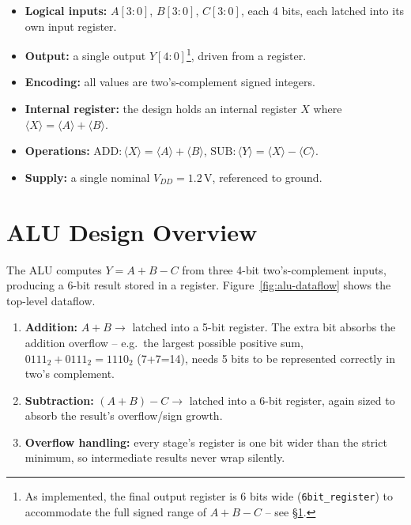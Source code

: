 \documentclass[11pt, a4paper]{article}
\newcommand{\sig}[1]{\texttt{#1}}
\begin{document}
\begin{itemize}
  \item \textbf{Logical inputs:} $A[3{:}0]$, $B[3{:}0]$, $C[3{:}0]$, each 4 bits, each latched into its own input register.
  \item \textbf{Output:} a single output $Y[4{:}0]$\footnote{As implemented, the final output register is 6 bits wide (\sig{6bit\_register}) to accommodate the full signed range of $A+B-C$ -- see \S\ref{sec:overview}.}, driven from a register.
  \item \textbf{Encoding:} all values are two's-complement signed integers.
  \item \textbf{Internal register:} the design holds an internal register $X$ where $\langle X \rangle = \langle A \rangle + \langle B \rangle$.
  \item \textbf{Operations:} $\mathrm{ADD}: \langle X \rangle = \langle A \rangle + \langle B \rangle$, \quad $\mathrm{SUB}: \langle Y \rangle = \langle X \rangle - \langle C \rangle$.
  \item \textbf{Supply:} a single nominal $V_{DD} = 1.2\,\mathrm{V}$, referenced to ground.
\end{itemize}

\section{ALU Design Overview}
\label{sec:overview}

The ALU computes $Y = A + B - C$ from three 4-bit two's-complement inputs,
producing a 6-bit result stored in a register. Figure~\ref{fig:alu-dataflow}
shows the top-level dataflow.

\begin{enumerate}
  \item \textbf{Addition:} $A + B \rightarrow$ latched into a 5-bit register.
        The extra bit absorbs the addition overflow -- e.g.\ the largest
        possible positive sum, $0111_2 + 0111_2 = 1110_2$ (7+7=14), needs
        5 bits to be represented correctly in two's complement.
  \item \textbf{Subtraction:} $(A+B) - C \rightarrow$ latched into a 6-bit
        register, again sized to absorb the result's overflow/sign growth.
  \item \textbf{Overflow handling:} every stage's register is one bit wider
        than the strict minimum, so intermediate results never wrap silently.
\end{enumerate}
\end{document}
